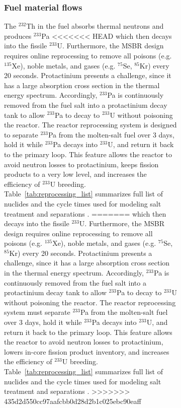 \begin{figure}[t!]
\begin{figure}[ht!]
\subsubsection{Fuel material flows}
The $^{232}$Th in the fuel absorbs thermal neutrons and produces $^{233}$Pa 
<<<<<<< HEAD
which then decays into the fissile $^{233}$U. Furthermore, the \gls{MSBR} design 
requires online reprocessing to remove all poisons (e.g. $^{135}$Xe), noble 
metals, and gases (e.g. $^{75}$Se, $^{85}$Kr) every 20 seconds. Protactinium 
presents a challenge, since it has a large absorption cross section in the 
thermal energy spectrum. Accordingly, $^{233}$Pa is continuously removed from 
the fuel salt into a protactinium decay tank to allow $^{233}$Pa to decay to 
$^{233}$U without poisoning the reactor. The reactor reprocessing system is 
designed to separate $^{233}$Pa from the molten-salt fuel over 3 days, hold it 
while $^{233}$Pa decays into $^{233}$U, and return it back to the primary loop. 
This feature allows the reactor to avoid neutron losses to protactinium, keeps 
fission products to a very low level, and increases the efficiency of $^{233}$U 
breeding. Table~\ref{tab:reprocessing_list} summarizes full list of nuclides and 
the cycle times used for modeling salt treatment and separations 
\cite{robertson_conceptual_1971}. 
=======
which then decays into the fissile $^{233}$U. Furthermore, the \gls{MSBR} 
design requires online reprocessing to remove all poisons (e.g. $^{135}$Xe), 
noble metals, and gases (e.g. $^{75}$Se, $^{85}$Kr) every 20 seconds. 
Protactinium presents a challenge, since it has a large absorption cross 
section in the thermal energy spectrum. Accordingly, $^{233}$Pa is continuously 
removed from the fuel salt into a protactinium decay tank to allow $^{233}$Pa 
to decay to $^{233}$U without poisoning the reactor. The reactor reprocessing 
system must separate $^{233}$Pa from the molten-salt fuel over 3 
days, hold it while $^{233}$Pa decays into $^{233}$U, and return it back to the 
primary loop. This feature allows the reactor to avoid neutron losses to 
protactinium, lowers in-core fission product inventory, and increases the 
efficiency of $^{233}$U breeding. Table~\ref{tab:reprocessing_list} summarizes 
full list of nuclides and the cycle times used for modeling salt treatment and 
separations \cite{robertson_conceptual_1971}. 
>>>>>>> 435d2d550cc97aafcbb0d28d2b1c025ebc90eaff


\end{figure}
\end{figure}
